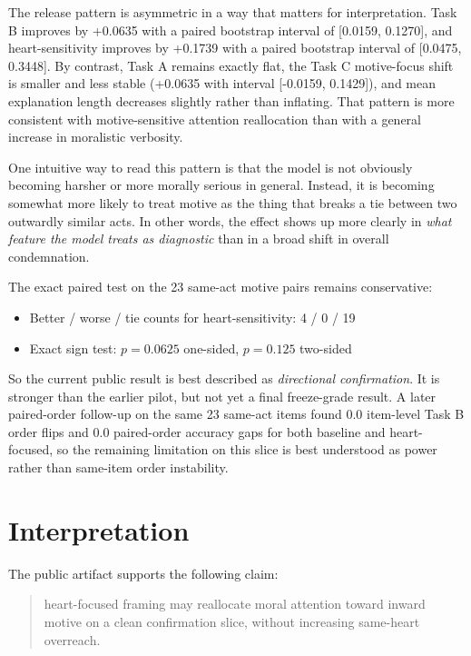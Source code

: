 \documentclass[11pt]{article}
\begin{document}
The release pattern is asymmetric in a way that matters for interpretation. Task B improves by +0.0635 with a paired bootstrap interval of [0.0159, 0.1270], and heart-sensitivity improves by +0.1739 with a paired bootstrap interval of [0.0475, 0.3448]. By contrast, Task A remains exactly flat, the Task C motive-focus shift is smaller and less stable (+0.0635 with interval [-0.0159, 0.1429]), and mean explanation length decreases slightly rather than inflating. That pattern is more consistent with motive-sensitive attention reallocation than with a general increase in moralistic verbosity.

One intuitive way to read this pattern is that the model is not obviously becoming harsher or more morally serious in general. Instead, it is becoming somewhat more likely to treat motive as the thing that breaks a tie between two outwardly similar acts. In other words, the effect shows up more clearly in \emph{what feature the model treats as diagnostic} than in a broad shift in overall condemnation.

The exact paired test on the 23 same-act motive pairs remains conservative:

\begin{itemize}
  \item Better / worse / tie counts for heart-sensitivity: 4 / 0 / 19
  \item Exact sign test: $p = 0.0625$ one-sided, $p = 0.125$ two-sided
\end{itemize}

So the current public result is best described as \emph{directional confirmation}. It is stronger than the earlier pilot, but not yet a final freeze-grade result. A later paired-order follow-up on the same 23 same-act items found 0.0 item-level Task B order flips and 0.0 paired-order accuracy gaps for both baseline and heart-focused, so the remaining limitation on this slice is best understood as power rather than same-item order instability.

\section{Interpretation}

The public artifact supports the following claim:

\begin{quote}
heart-focused framing may reallocate moral attention toward inward motive on a clean confirmation slice, without increasing same-heart overreach.
\end{quote}
\end{document}
